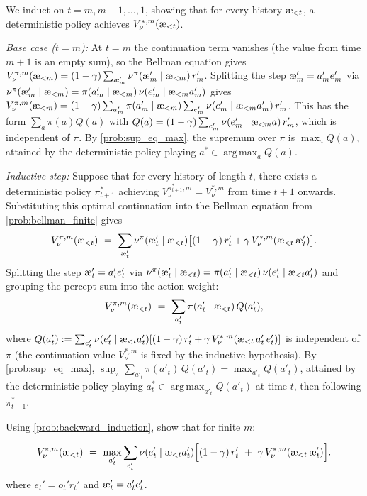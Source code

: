 \documentclass[fontsize=11pt, parskip=half]{scrartcl}
\DeclareMathOperator*{\argmax}{arg\,max}
\newcommand{\aes}{\textnormal{\ae}}
\begin{document}
\begin{solution}
We induct on $t = m, m-1, \ldots, 1$, showing that for every history $\aes_{<t}$, a deterministic policy achieves $V_\nu^{*,m}(\aes_{<t})$.

\emph{Base case ($t = m$):} At $t = m$ the continuation term vanishes (the value from time $m+1$ is an empty sum), so the Bellman equation gives $V_\nu^{\pi,m}(\aes_{<m}) = (1-\gamma) \sum_{\aes'_m} \nu^\pi(\aes'_m \mid \aes_{<m})\, r'_m$.
Splitting the step $\aes'_m = a'_m e'_m$ via $\nu^\pi(\aes'_m \mid \aes_{<m}) = \pi(a'_m \mid \aes_{<m})\, \nu(e'_m \mid \aes_{<m} a'_m)$ gives $V_\nu^{\pi,m}(\aes_{<m}) = (1-\gamma) \sum_{a'_m} \pi(a'_m \mid \aes_{<m}) \sum_{e'_m} \nu(e'_m \mid \aes_{<m} a'_m)\, r'_m$.
This has the form $\sum_a \pi(a) Q(a)$ with $Q(a) = (1-\gamma)\sum_{e'_m} \nu(e'_m \mid \aes_{<m} a)\, r'_m$, which is independent of $\pi$.
By \cref{prob:sup_eq_max}, the supremum over $\pi$ is $\max_a Q(a)$, attained by the deterministic policy playing $a^* \in \argmax_a Q(a)$.

\emph{Inductive step:} Suppose that for every history of length $t$, there exists a deterministic policy $\pi^*_{t+1}$ achieving $V_\nu^{\pi^*_{t+1},m} = V_\nu^{*,m}$ from time $t+1$ onwards.
Substituting this optimal continuation into the Bellman equation from \cref{prob:bellman_finite} gives
\[
    V_\nu^{\pi,m}(\aes_{<t}) ~=~ \sum_{\aes'_t} \nu^\pi(\aes'_t \mid \aes_{<t}) \big[(1-\gamma)\, r'_t + \gamma\, V_\nu^{*,m}(\aes_{<t}\, \aes'_t)\big].
\]
Splitting the step $\aes'_t = a'_t e'_t$ via $\nu^\pi(\aes'_t \mid \aes_{<t}) = \pi(a'_t \mid \aes_{<t})\, \nu(e'_t \mid \aes_{<t} a'_t)$ and grouping the percept sum into the action weight:
\[
    V_\nu^{\pi,m}(\aes_{<t}) ~=~ \sum_{a'_t} \pi(a'_t \mid \aes_{<t})\, Q(a'_t),
\]
where $Q(a'_t) := \sum_{e'_t} \nu(e'_t \mid \aes_{<t} a'_t) [(1-\gamma)\, r'_t + \gamma\, V_\nu^{*,m}(\aes_{<t}\, a'_t\, e'_t)]$ is independent of $\pi$ (the continuation value $V_\nu^{*,m}$ is fixed by the inductive hypothesis).
By \cref{prob:sup_eq_max}, $\sup_\pi \sum_{a'_t} \pi(a'_t)\, Q(a'_t) = \max_{a'_t} Q(a'_t)$, attained by the deterministic policy playing $a^*_t \in \argmax_{a'_t} Q(a'_t)$ at time $t$, then following $\pi^*_{t+1}$.
\end{solution}

\begin{exercise}
\label{prob:bellman_opt}
Using \cref{prob:backward_induction}, show that for finite $m$:

\[
    V_\nu^{*,m}(\aes_{<t}) ~=~ \max_{a'_t} \sum_{e'_t} \nu(e'_t \mid \aes_{<t} a'_t) \Big[(1-\gamma)\, r'_t ~+~ \gamma\, V_\nu^{*,m}(\aes_{<t}\, \aes'_t)\Big].
\]
where $e_t' = o_t' r_t'$ and $\aes'_t = a'_t e'_t$.
\end{exercise}
\end{document}
